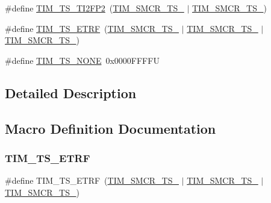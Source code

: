 \begin{DoxyCompactItemize}
\item 
\#define \mbox{\hyperlink{group___t_i_m___trigger___selection_ga0ed58a269bccd3f22d19cc9a2ba3123f}{T\+I\+M\+\_\+\+T\+S\+\_\+\+T\+I2\+F\+P2}}~(\mbox{\hyperlink{group___peripheral___registers___bits___definition_gacb82212fcc89166a43ff97542da9182d}{T\+I\+M\+\_\+\+S\+M\+C\+R\+\_\+\+T\+S\+\_}} $\vert$ \mbox{\hyperlink{group___peripheral___registers___bits___definition_gacf0dbaf4a2ec8759f283f82a958ef6a8}{T\+I\+M\+\_\+\+S\+M\+C\+R\+\_\+\+T\+S\+\_}})
\item 
\#define \mbox{\hyperlink{group___t_i_m___trigger___selection_gaece08e02e056613a882aa7ff0a6ccc2d}{T\+I\+M\+\_\+\+T\+S\+\_\+\+E\+T\+RF}}~(\mbox{\hyperlink{group___peripheral___registers___bits___definition_ga8d1f040f9259acb3c2fba7b0c7eb3d96}{T\+I\+M\+\_\+\+S\+M\+C\+R\+\_\+\+T\+S\+\_}} $\vert$ \mbox{\hyperlink{group___peripheral___registers___bits___definition_gacb82212fcc89166a43ff97542da9182d}{T\+I\+M\+\_\+\+S\+M\+C\+R\+\_\+\+T\+S\+\_}} $\vert$ \mbox{\hyperlink{group___peripheral___registers___bits___definition_gacf0dbaf4a2ec8759f283f82a958ef6a8}{T\+I\+M\+\_\+\+S\+M\+C\+R\+\_\+\+T\+S\+\_}})
\item 
\#define \mbox{\hyperlink{group___t_i_m___trigger___selection_ga257bee9dc9f2f71a73124dd8c2329480}{T\+I\+M\+\_\+\+T\+S\+\_\+\+N\+O\+NE}}~0x0000\+F\+F\+F\+FU
\end{DoxyCompactItemize}


\subsection{Detailed Description}


\subsection{Macro Definition Documentation}
\mbox{\label{group___t_i_m___trigger___selection_gaece08e02e056613a882aa7ff0a6ccc2d}} 
\subsubsection{\texorpdfstring{TIM\_TS\_ETRF}{TIM\_TS\_ETRF}}
{\footnotesize\ttfamily \#define T\+I\+M\+\_\+\+T\+S\+\_\+\+E\+T\+RF~(\mbox{\hyperlink{group___peripheral___registers___bits___definition_ga8d1f040f9259acb3c2fba7b0c7eb3d96}{T\+I\+M\+\_\+\+S\+M\+C\+R\+\_\+\+T\+S\+\_}} $\vert$ \mbox{\hyperlink{group___peripheral___registers___bits___definition_gacb82212fcc89166a43ff97542da9182d}{T\+I\+M\+\_\+\+S\+M\+C\+R\+\_\+\+T\+S\+\_}} $\vert$ \mbox{\hyperlink{group___peripheral___registers___bits___definition_gacf0dbaf4a2ec8759f283f82a958ef6a8}{T\+I\+M\+\_\+\+S\+M\+C\+R\+\_\+\+T\+S\+\_}})}

